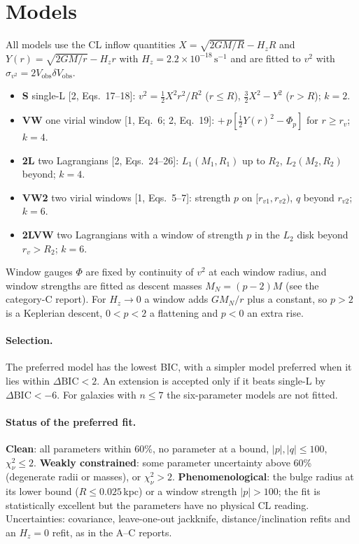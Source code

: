 \documentclass[10pt]{article}
\begin{document}
\section{Models}
All models use the CL inflow quantities $X=\sqrt{2GM/R}-H_zR$ and $Y(r)=\sqrt{2GM/r}-H_zr$ with $H_z=2.2\times10^{-18}\,\mathrm{s^{-1}}$ and are fitted to $v^2$ with $\sigma_{v^2}=2V_\mathrm{obs}\delta V_\mathrm{obs}$.
\begin{itemize}\itemsep1pt
\item \textbf{S} single-L [2, Eqs.~17--18]: $v^2=\tfrac12X^2r^2/R^2$ ($r\le R$), $\tfrac32X^2-Y^2$ ($r>R$); $k=2$.
\item \textbf{VW} one virial window [1, Eq.~6; 2, Eq.~19]: $+\,p[\tfrac12Y(r)^2-\Phi_p]$ for $r\ge r_v$; $k=4$.
\item \textbf{2L} two Lagrangians [2, Eqs.~24--26]: $L_1(M_1,R_1)$ up to $R_2$, $L_2(M_2,R_2)$ beyond; $k=4$.
\item \textbf{VW2} two virial windows [1, Eqs.~5--7]: strength $p$ on $[r_{v1},r_{v2})$, $q$ beyond $r_{v2}$; $k=6$.
\item \textbf{2LVW} two Lagrangians with a window of strength $p$ in the $L_2$ disk beyond $r_v>R_2$; $k=6$.
\end{itemize}
Window gauges $\Phi$ are fixed by continuity of $v^2$ at each window radius, and window strengths are fitted as descent masses $M_N=(p-2)M$ (see the category-C report). For $H_z\to0$ a window adds $GM_N/r$ plus a constant, so $p>2$ is a Keplerian descent, $0<p<2$ a flattening and $p<0$ an extra rise.

\paragraph{Selection.} The preferred model has the lowest BIC, with a simpler model preferred when it lies within $\Delta\mathrm{BIC}<2$. An extension is accepted only if it beats single-L by $\Delta\mathrm{BIC}<-6$. For galaxies with $n\le7$ the six-parameter models are not fitted.
\paragraph{Status of the preferred fit.} \textbf{Clean}: all parameters within 60\%, no parameter at a bound, $|p|,|q|\le100$, $\chi^2_\nu\le2$. \textbf{Weakly constrained}: some parameter uncertainty above 60\% (degenerate radii or masses), or $\chi^2_\nu>2$. \textbf{Phenomenological}: the bulge radius at its lower bound ($R\le0.025$\,kpc) or a window strength $|p|>100$; the fit is statistically excellent but the parameters have no physical CL reading. Uncertainties: covariance, leave-one-out jackknife, distance/inclination refits and an $H_z=0$ refit, as in the A--C reports.
\end{document}
